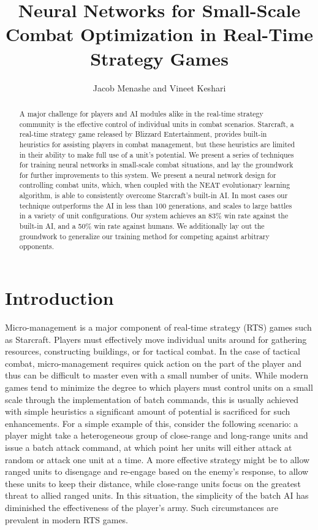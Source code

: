 \documentclass[10pt,a4paper,twocolumn]{article}
\begin{document}
\title{Neural Networks for Small-Scale Combat Optimization in Real-Time Strategy Games}
\author{Jacob Menashe and Vineet Keshari}
\maketitle

\begin{abstract}
A major challenge for players and AI modules alike in the real-time strategy community is the effective control of individual units in combat scenarios. Starcraft, a real-time strategy game released by Blizzard Entertainment, provides built-in heuristics for assisting players in combat management, but these heuristics are limited in their ability to make full use of a unit's potential. We present a series of techniques for training neural networks in small-scale combat situations, and lay the groundwork for further improvements to this system. We present a neural network design for controlling combat units, which, when coupled with the NEAT evolutionary learning algorithm, is able to consistently overcome Starcraft's built-in AI. In most cases our technique outperforms the AI in less than 100 generations, and scales to large battles in a variety of unit configurations. Our system achieves an 83\% win rate against the built-in AI, and a 50\% win rate against humans. We additionally lay out the groundwork to generalize our training method for competing against arbitrary opponents.
\end{abstract}

\section{Introduction}

Micro-management is a major component of real-time strategy (RTS) games such as Starcraft. Players must effectively move individual units around for gathering resources, constructing buildings, or for tactical combat. In the case of tactical combat, micro-management requires quick action on the part of the player and thus can be difficult to master even with a small number of units. While modern games tend to minimize the degree to which players must control units on a small scale through the implementation of batch commands, this is usually achieved with simple heuristics a significant amount of potential is sacrificed for such enhancements. For a simple example of this, consider the following scenario: a player might take a heterogeneous group of close-range and long-range units and issue a batch attack command, at which point her units will either attack at random or attack one unit at a time. A more effective strategy might be to allow ranged units to disengage and re-engage based on the enemy's response, to allow these units to keep their distance, while close-range units focus on the greatest threat to allied ranged units. In this situation, the simplicity of the batch AI has diminished the effectiveness of the player's army. Such circumstances are prevalent in modern RTS games.
\end{document}
